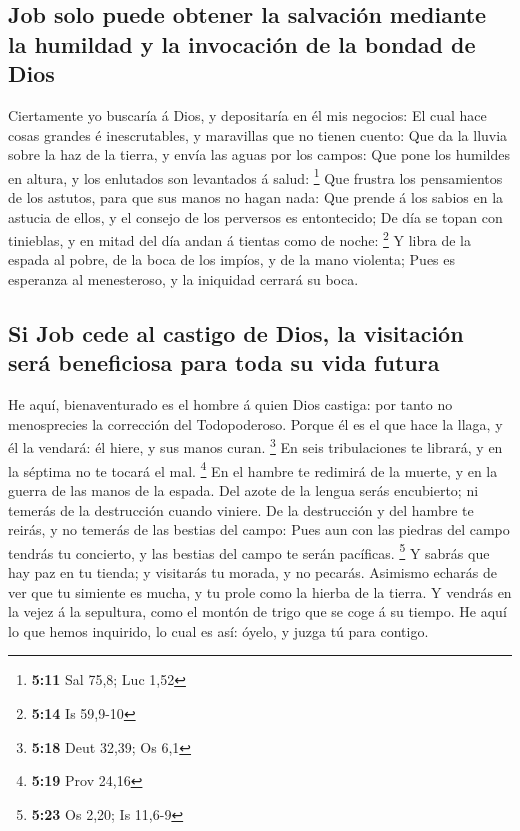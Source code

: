 \hypertarget{job-solo-puede-obtener-la-salvaciuxf3n-mediante-la-humildad-y-la-invocaciuxf3n-de-la-bondad-de-dios}{%
\subsection{Job solo puede obtener la salvación mediante la humildad y
la invocación de la bondad de
Dios}\label{job-solo-puede-obtener-la-salvaciuxf3n-mediante-la-humildad-y-la-invocaciuxf3n-de-la-bondad-de-dios}}

 Ciertamente yo buscaría á Dios, y depositaría en él mis
negocios:  El cual hace cosas grandes é inescrutables, y
maravillas que no tienen cuento:  Que da la lluvia sobre la
haz de la tierra, y envía las aguas por los campos:  Que
pone los humildes en altura, y los enlutados son levantados á salud:
\footnote{\textbf{5:11} Sal 75,8; Luc 1,52}  Que frustra
los pensamientos de los astutos, para que sus manos no hagan nada:
 Que prende á los sabios en la astucia de ellos, y el
consejo de los perversos es entontecido;  De día se topan
con tinieblas, y en mitad del día andan á tientas como de noche:
\footnote{\textbf{5:14} Is 59,9-10}  Y libra de la espada
al pobre, de la boca de los impíos, y de la mano violenta; 
Pues es esperanza al menesteroso, y la iniquidad cerrará su boca.

\hypertarget{si-job-cede-al-castigo-de-dios-la-visitaciuxf3n-seruxe1-beneficiosa-para-toda-su-vida-futura}{%
\subsection{Si Job cede al castigo de Dios, la visitación será
beneficiosa para toda su vida
futura}\label{si-job-cede-al-castigo-de-dios-la-visitaciuxf3n-seruxe1-beneficiosa-para-toda-su-vida-futura}}

 He aquí, bienaventurado es el hombre á quien Dios castiga:
por tanto no menosprecies la corrección del Todopoderoso. 
Porque él es el que hace la llaga, y él la vendará: él hiere, y sus
manos curan. \footnote{\textbf{5:18} Deut 32,39; Os 6,1} 
En seis tribulaciones te librará, y en la séptima no te tocará el mal.
\footnote{\textbf{5:19} Prov 24,16}  En el hambre te
redimirá de la muerte, y en la guerra de las manos de la espada.
 Del azote de la lengua serás encubierto; ni temerás de la
destrucción cuando viniere.  De la destrucción y del hambre
te reirás, y no temerás de las bestias del campo:  Pues aun
con las piedras del campo tendrás tu concierto, y las bestias del campo
te serán pacíficas. \footnote{\textbf{5:23} Os 2,20; Is 11,6-9}
 Y sabrás que hay paz en tu tienda; y visitarás tu morada,
y no pecarás.  Asimismo echarás de ver que tu simiente es
mucha, y tu prole como la hierba de la tierra.  Y vendrás
en la vejez á la sepultura, como el montón de trigo que se coge á su
tiempo.  He aquí lo que hemos inquirido, lo cual es así:
óyelo, y juzga tú para contigo.

